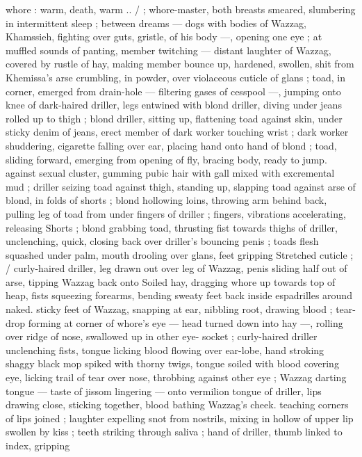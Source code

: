 whore : {\gl}{\td} warm, death, warm ..{\gr} {\slash} ; whore-master, both breasts 
smeared, slumbering in intermittent sleep ; between dreams --- dogs 
with bodies of Wazzag, Khamssieh, fighting over guts, gristle, of his 
body ---, opening one eye ; at muffled sounds of panting, member 
twitching --- distant laughter of Wazzag, covered by rustle of hay, 
making member bounce up, hardened, swollen, shit from Khemissa's 
arse crumbling, in powder, over violaceous cuticle of glans ; toad, in 
corner, emerged from drain-hole --- filtering gases of cesspool ---, 
jumping onto knee of dark-haired driller, legs entwined with blond 
driller, diving under jeans rolled up to thigh ; blond driller, sitting up, 
flattening toad against skin, under sticky denim of jeans, erect 
member of dark worker touching wrist ; dark worker shuddering, 
cigarette falling over ear, placing hand onto hand of blond ; toad, 
sliding forward, emerging from opening of fly, bracing body, ready to 
jump. against sexual cluster, gumming pubic hair with gall mixed with 
excremental mud ; driller seizing toad against thigh, standing up, 
slapping toad against arse of blond, in folds of shorts ; blond 
hollowing loins, throwing arm behind back, pulling leg of toad from 
under fingers of driller ; fingers, vibrations accelerating, releasing 
Shorts ; blond grabbing toad, thrusting fist towards thighs of driller, 
unclenching, quick, closing back over driller's bouncing penis ; toads 
flesh squashed under palm, mouth drooling over glans, feet gripping 
Stretched cuticle ; {\slash} curly-haired driller, leg drawn out over leg of 
Wazzag, penis sliding half out of arse, tipping Wazzag back onto 
Soiled hay, dragging whore up towards top of heap, fists squeezing 
forearms, bending sweaty feet back inside espadrilles around naked. 
sticky feet of Wazzag, snapping at ear, nibbling root, drawing blood 
; tear-drop forming at corner of whore's eye --- head turned down 
into hay ---, rolling over ridge of nose, swallowed up in other eye- 
socket ; curly-haired driller unclenching fists, tongue licking blood 
flowing over ear-lobe, hand stroking shaggy black mop spiked with 
thorny twigs, tongue soiled with blood covering eye, licking trail of 
tear over nose, throbbing against other eye ; Wazzag darting tongue 
--- taste of jissom lingering --- onto vermilion tongue of driller, lips 
drawing close, sticking together, blood bathing Wazzag's cheek. 
teaching corners of lips joined ; laughter expelling snot from 
nostrils, mixing in hollow of upper lip swollen by kiss ; teeth striking 
through saliva ; hand of driller, thumb linked to index, gripping 
